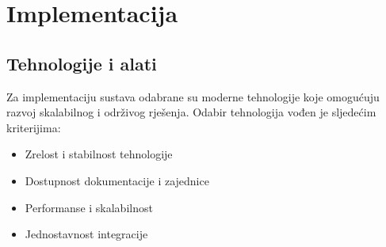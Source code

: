 \chapter{Implementacija}
\label{ch:implementation}


\section{Tehnologije i alati}
\label{sec:technologies}

Za implementaciju sustava odabrane su moderne tehnologije koje omogućuju razvoj 
skalabilnog i održivog rješenja. Odabir tehnologija vođen je sljedećim kriterijima:
\begin{itemize}
    \item Zrelost i stabilnost tehnologije
    \item Dostupnost dokumentacije i zajednice
    \item Performanse i skalabilnost
    \item Jednostavnost integracije
\end{itemize}

